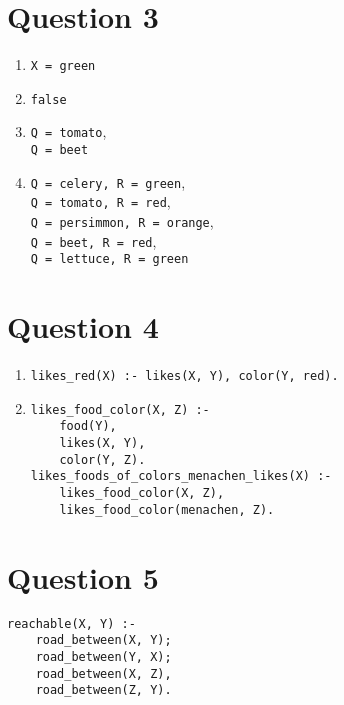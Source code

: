 \documentclass[13pt]{article}
\begin{document}
\newpage
\section*{Question 3}
\begin{enumerate}[label=(\alph*)]
\item \texttt{X = green}
\item \texttt{false}
\item \texttt{Q = tomato}, \\ \texttt{Q = beet}
\item \texttt{Q = celery, R = green}, \\
  \texttt{Q = tomato, R = red}, \\
  \texttt{Q = persimmon, R = orange}, \\
  \texttt{Q = beet, R = red}, \\
  \texttt{Q = lettuce, R = green} \\
\end{enumerate}


\newpage
\section*{Question 4}
\begin{enumerate}[label=(\alph*)]
\item \texttt{likes\_red(X) :- likes(X, Y), color(Y, red).}
\item
\begin{verbatim}
likes_food_color(X, Z) :-
    food(Y),
    likes(X, Y),
    color(Y, Z).
likes_foods_of_colors_menachen_likes(X) :-
    likes_food_color(X, Z),
    likes_food_color(menachen, Z).
\end{verbatim}
\end{enumerate}


\newpage
\section*{Question 5}
\begin{verbatim}
reachable(X, Y) :-
    road_between(X, Y);
    road_between(Y, X);
    road_between(X, Z), 
    road_between(Z, Y).
\end{verbatim}


\newpage
\end{document}
